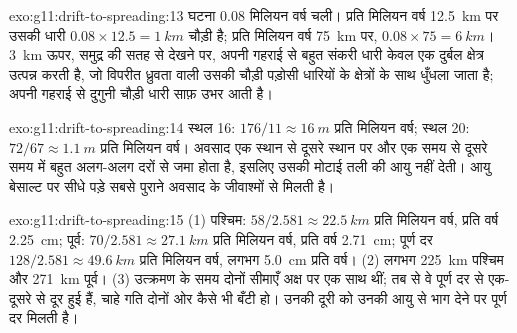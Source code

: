 \begin{solution}{exo:g11:drift-to-spreading:13}
घटना \num{0.08} मिलियन वर्ष चली। प्रति मिलियन वर्ष \qty{12.5}{km} पर
उसकी धारी $0.08 \times 12.5 = \qty{1}{km}$ चौड़ी है; प्रति मिलियन वर्ष \qty{75}{km}
पर, $0.08 \times 75 = \qty{6}{km}$। \qty{3}{km} ऊपर, समुद्र की सतह से
देखने पर, अपनी गहराई से बहुत संकरी धारी केवल एक दुर्बल
क्षेत्र उत्पन्न करती है, जो विपरीत ध्रुवता वाली उसकी चौड़ी पड़ोसी धारियों के क्षेत्रों के साथ
धुँधला जाता है; अपनी गहराई से दुगुनी चौड़ी धारी साफ़ उभर आती है।
\end{solution}

\begin{solution}{exo:g11:drift-to-spreading:14}
स्थल 16: $176/11 \approx \qty{16}{m}$ प्रति मिलियन वर्ष; स्थल 20: $72/67
\approx \qty{1.1}{m}$ प्रति मिलियन वर्ष। अवसाद एक स्थान से दूसरे स्थान पर और एक समय से
दूसरे समय में बहुत अलग-अलग दरों से जमा होता है, इसलिए उसकी मोटाई
तली की आयु नहीं देती। आयु बेसाल्ट पर सीधे पड़े सबसे पुराने
अवसाद के जीवाश्मों से मिलती है।
\end{solution}

\begin{solution}{exo:g11:drift-to-spreading:15}
(1) पश्चिम: $58/2.581 \approx \qty{22.5}{km}$ प्रति मिलियन वर्ष,
प्रति वर्ष \qty{2.25}{cm}; पूर्व: $70/2.581 \approx \qty{27.1}{km}$ प्रति मिलियन
वर्ष, प्रति वर्ष \qty{2.71}{cm}; पूर्ण दर $128/2.581 \approx \qty{49.6}{km}$ प्रति
मिलियन वर्ष, लगभग \qty{5.0}{cm} प्रति वर्ष। (2) लगभग \qty{225}{km} पश्चिम और
\qty{271}{km} पूर्व। (3) उत्क्रमण के समय दोनों सीमाएँ अक्ष पर
एक साथ थीं; तब से वे पूर्ण दर से एक-दूसरे से दूर हुई हैं, चाहे
गति दोनों ओर कैसे भी बँटी हो। उनकी दूरी को
उनकी आयु से भाग देने पर पूर्ण दर मिलती है।
\end{solution}

